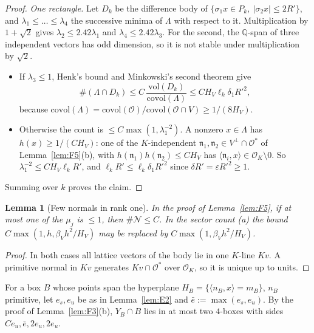 \documentclass[aps,prx,twocolumn,superscriptaddress,nofootinbib,longbibliography]{revtex4-2}
\theoremstyle{plain}
\newtheorem{lemma}{Lemma}
\theoremstyle{definition}
\theoremstyle{remark}
\newcommand{\Q}{\mathbb{Q}}
\begin{document}
\begin{proof}
\emph{One rectangle.} Let $D_k$ be the difference body of $\{\sigma_1x\in P_k,\ |\sigma_2x|\le2R'\}$, and
$\lambda_1\le\dots\le\lambda_4$ the successive minima of $\Lambda$ with respect to it. Multiplication by
$1+\sqrt2$ gives $\lambda_2\le2.42\lambda_1$ and $\lambda_4\le2.42\lambda_3$. For the second, the $\Q$-span of three
independent vectors has odd dimension, so it is not stable under multiplication by $\sqrt2$.
\begin{itemize}\setlength\itemsep{0pt}
\item If $\lambda_3\le1$, Henk's bound and Minkowski's second theorem give
\[\#(\Lambda\cap D_k)\le C\,\frac{\mathrm{vol}(D_k)}{\mathrm{covol}(\Lambda)}\le CH_V\ell_k\delta_1R'^2,\]
because
$\mathrm{covol}(\Lambda)=\mathrm{covol}(\mathcal O)/\mathrm{covol}(\mathcal O\cap V)\ge1/(8H_V)$.
\item Otherwise the count is $\le C\max(1,\lambda_1^{-2})$. A nonzero $x\in\Lambda$ has $h(x)\ge1/(CH_V)$:
one of the $K$-independent $\mathfrak n_1,\mathfrak n_2\in V^\perp\cap\mathcal O^*$ of Lemma~\ref{lem:F5}(b), with $h(\mathfrak n_1)h(\mathfrak n_2)\le CH_V$
has $\langle\mathfrak n_i,x\rangle\in\mathcal O_K\setminus0$. So $\lambda_1^{-2}\le CH_V\ell_kR'$, and
$\ell_kR'\le\ell_k\delta_1R'^2$ since $\delta R'=\varepsilon R'^2\ge1$.
\end{itemize}
Summing over $k$ proves the claim.
\end{proof}

\begin{lemma}[Few normals in rank one]\label{lem:G2}
In the proof of Lemma~\ref{lem:F5}, if at most one of the $\mu_j$ is $\le1$, then $\#\mathcal N\le C$. In the
sector count (a) the bound $C\max(1,h,\beta_Vh^2/H_V)$ may be replaced by $C\max(1,\beta_Vh^2/H_V)$.
\end{lemma}
\begin{proof}
In both cases all lattice vectors of the body lie in one $K$-line $Kv$. A primitive normal in $Kv$
generates $Kv\cap\mathcal O^*$ over $\mathcal O_K$, so it is unique up to units.
\end{proof}

For a box $B$ whose points span the hyperplane $H_B=\{\langle n_B,x\rangle=m_B\}$, $n_B$ primitive, let
$e_s,e_u$ be as in Lemma~\ref{lem:E2} and $\bar e:=\max(e_s,e_u)$. By the proof of
Lemma~\ref{lem:F3}(b), $Y_B\cap B$ lies in at most two $4$-boxes with sides $Ce_u,\bar e,2e_u,2e_u$.
\end{document}
